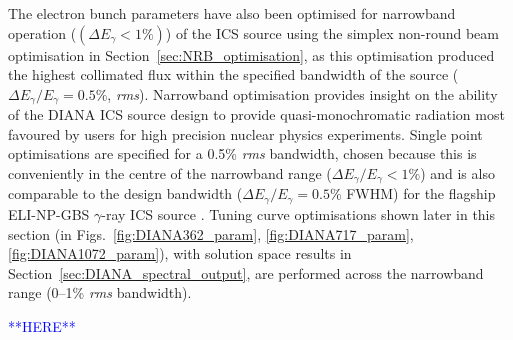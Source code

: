 \documentclass[../main.tex]{subfiles}
\begin{document}
The electron bunch parameters have also been optimised for narrowband operation ($\left(\Delta E_{\gamma}<1\%\right)$) of the ICS source using the simplex non-round beam optimisation in Section~\ref{sec:NRB_optimisation}, as this optimisation produced the highest collimated flux within the specified bandwidth of the source ($\Delta E_{\gamma}/E_{\gamma}=0.5\%$, \textit{rms}). Narrowband optimisation provides insight on the ability of the DIANA ICS source design to provide quasi-monochromatic radiation most favoured by users for high precision nuclear physics experiments. Single point optimisations are specified for a 0.5\% \textit{rms} bandwidth, chosen because this is conveniently in the centre of the narrowband range ($\Delta E_{\gamma}/E_{\gamma}<1\%$) and is also comparable to the design bandwidth ($\Delta E_{\gamma}/E_{\gamma}=0.5\%$ FWHM) for the  flagship ELI-NP-GBS $\gamma$-ray ICS source \cite{elinp2019vega}. Tuning curve optimisations shown later in this section (in Figs.~\ref{fig:DIANA362_param}, \ref{fig:DIANA717_param}, \ref{fig:DIANA1072_param}), with solution space results in Section~\ref{sec:DIANA_spectral_output}, are performed across the narrowband range (0--1\% \textit{rms} bandwidth).    

\textcolor{blue}{**HERE**}
\end{document}
